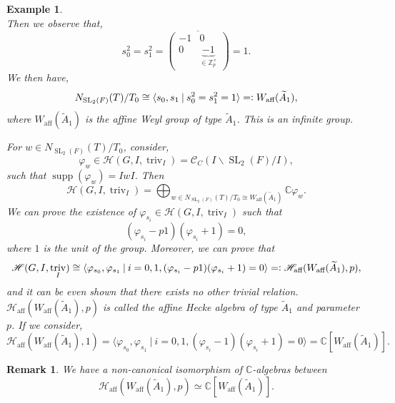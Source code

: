 \documentclass[8pt]{article}
\newtheorem{remark}{Remark}[section]
\newtheorem{example}{Example}[section]
\DeclareMathOperator{\triv}{triv}
\DeclareMathOperator{\SL}{SL}
\DeclareMathOperator{\supp}{supp}
\newcommand{\defqe}{=\vcentcolon}
\newcommand{\Z}[0]{\mathbb{Z}}
\newcommand{\C}[0]{\mathbb{C}}
\newcommand{\sep}[0]{\:|\:}
\newcommand{\hecke}[0]{\mathscr{H}}
\begin{document}
\begin{example}
\begin{equation*}
  \end{equation*}
  Then we observe that,
  \begin{equation*}
    s_0^2=s_1^2 = \overline{\begin{pmatrix}
      -1 & 0\\
      0 & \underbrace{-1}_{\in\Z_p^\times}
    \end{pmatrix}} = 1.
  \end{equation*}
  We then have,
  \begin{equation*}
    N_{\SL_2(F)}(T)/T_0\cong\langle s_0,s_1\sep s_0^2=s_1^2=1\rangle \defqe W_{\text{aff}}(\widetilde{A}_1),
  \end{equation*}
  where $W_{\text{aff}}(\widetilde{A}_1)$ is the affine Weyl group of type $\widetilde{A}_1$. This is an infinite group.
  \par For $w\in N_{\SL_2(F)}(T)/T_0$, consider,
  \begin{equation*}
    \varphi_w\in\hecke(G,I,\triv_I)=\mathcal{C}_C(I\backslash \SL_2(F)/I),
  \end{equation*}
  such that $\supp(\varphi_{w})=IwI$. Then 
  \begin{equation*}
    \hecke(G,I,\triv_I)=\bigoplus_{w\in N_{\SL_2(F)}(T)/T_0\cong W_{\text{aff}}(\widetilde{A}_1)}\C\varphi_w.
  \end{equation*}
  We can prove the existence of $\varphi_{s_i}\in\hecke(G,I,\triv_I)$ such that 
  \begin{equation*}
    (\varphi_{s_i}-p1)(\varphi_{s_i}+1)=0,
  \end{equation*}
  where $1$ is the unit of the group. Moreover, we can prove that 
  \begin{equation*}
    \hecke(G,I,\triv_I)\cong\langle\varphi_{s_0},\varphi_{s_1}\sep i=0,1,(\varphi_{s_i}-p1)(\varphi_{s_i}+1)=0\rangle\defqe \hecke_{\text{aff}}(W_{\text{aff}}(\widetilde{A}_1),p),
  \end{equation*}
  and it can be even shown that there exists no other trivial relation. $\hecke_{\text{aff}}(W_{\text{aff}}(\widetilde{A}_1),p)$ is called the affine Hecke algebra of type $\widetilde{A}_1$ and parameter $p$. If we consider,
  \begin{equation*}
    \hecke_{\text{aff}}(W_{\text{aff}}(\widetilde{A}_1),1) = \langle\varphi_{s_0},\varphi_{s_1}\sep i=0,1,(\varphi_{s_i}-1)(\varphi_{s_i}+1)=0\rangle = \C[W_{\text{aff}}(\widetilde{A}_1)].
  \end{equation*}
\end{example}

\begin{remark}
  We have a non-canonical isomorphism of $\C$-algebras between 
  \begin{equation*}
    \hecke_{\text{aff}}(W_{\text{aff}}(\widetilde{A}_1),p)\simeq\C[W_{\text{aff}}(\widetilde{A}_1)].
  \end{equation*}
\end{remark}
\end{document}
